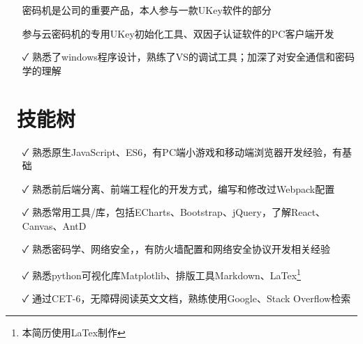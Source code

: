 \documentclass[14pt]{resume}
\begin{document}
\begin{itemize}
    \item[\faFlagO] 密码机是公司的重要产品，本人参与一款UKey软件的\textbf{\color{red}{windows开发}}部分
    \item[\faCode] 参与云密码机的专用UKey初始化工具、双因子认证软件的PC客户端开发
    \item[\faCheck] 熟悉了windows程序设计，熟练了VS的调试工具；加深了对安全通信和密码学的理解
\end{itemize}


\section{\faCogs\ 技能树}

\begin{itemize}
    \item[\faCheck] 熟悉原生JavaScript、ES6，有PC端小游戏和移动端浏览器\textbf{\color{red}{H5小游戏}}开发经验，有\textbf{\color{red}{python}}基础
    \item[\faCheck] 熟悉前后端分离、前端工程化的开发方式，编写和修改过Webpack配置
    \item[\faCheck] 熟悉常用工具/库，包括ECharts、Bootstrap、jQuery，了解React、Canvas、AntD
    \item[\faCheck] 熟悉密码学、网络安全，\textbf{\color{red}{HTTPS}}，有防火墙配置和网络安全协议开发相关经验
    \item[\faCheck] 熟悉python可视化库Matplotlib、排版工具Markdown、LaTex\footnote{本简历使用LaTex制作}
    \item[\faCheck] 通过CET-6，无障碍阅读英文文档，熟练使用Google、Stack Overflow检索
\end{itemize}
\end{document}
